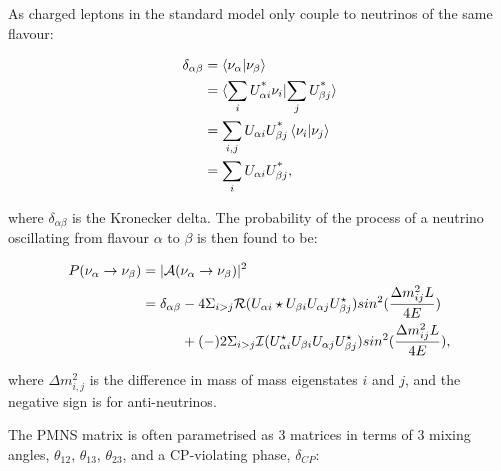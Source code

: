 As charged leptons in the standard model only couple to neutrinos of the same flavour:

 \begin{equation}
 \begin{aligned}
\delta_{\alpha\beta} &= \bra{\nu_\alpha}\ket{\nu_\beta}\\
&= \langle\sum_i U^{\text{*}}_{\alpha i}\nu_i}|{\sum_j U^{\text{*}}_{\beta j}\rangle\\
&= \sum_{i,j}U_{\alpha i}U^{\text{*}}_{\beta j}\bra{\nu_i}\ket{\nu_j}\\
&=\sum_i U_{\alpha i}U^{\text{*}}_{\beta j},
 \end{aligned}
\end{equation}

where $\delta_{\alpha\beta}$ is the Kronecker delta. The probability of the process of a neutrino oscillating from flavour $\alpha$ to $\beta$ is then found to be:

\begin{equation}
\begin{aligned}
P(\nu_\alpha \rightarrow \nu_\beta) &= |\mathcal{A}(\nu_\alpha \rightarrow \nu_\beta)|^2 \\
&= \delta_{\alpha\beta} - 4 \Sigma_{i>j}\mathcal{R}(U_{\alpha i}\star U_{\beta i} U_{\alpha j} U_{\beta j}^\star) sin^2 (\frac{\Delta m^2_{ij}L}{4E})\\ 
&\hphantom{= \delta_{\alpha\beta}.}+(-) 2 \Sigma_{i>j}\mathcal{I}(U_{\alpha i}^\star U_{\beta i} U_{\alpha j} U_{\beta j}^\star) sin^2 (\frac{\Delta m^2_{ij}L}{4E}),
\end{aligned}
\label{eqn:oscprob}
\end{equation}

where $\Delta m^{2}_{i,j}$ is the difference in mass of mass eigenstates $i$ and $j$, and the negative sign is for anti-neutrinos.

The PMNS matrix is often parametrised as 3 matrices in terms of 3 mixing angles, $\theta_{12}$, $\theta_{13}$, $\theta_{23}$, and a CP-violating phase, $\delta_{CP}$:

